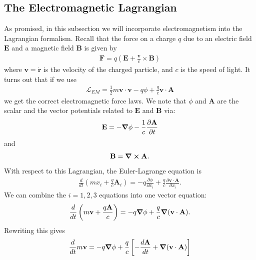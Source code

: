 \documentclass{book}
\theoremstyle{definition}
\newcommand{\p}{\partial}
\newcommand{\lag}{\mathcal{L}}
\newcommand{\f}[2]{\frac{#1}{#2}}
\newcommand{\lp}{\left(}
\newcommand{\rp}{\right)}
\newcommand{\lb}{\left[}
\newcommand{\rb}{\right]}
\begin{document}
\subsection{The Electromagnetic Lagrangian}
As promised, in this subsection we will incorporate electromagnetism into the Lagrangian formalism. Recall that the force on a charge $q$ due to an electric field $\mathbf{E}$ and a magnetic field $\mathbf{B}$ is given by
\begin{align}
\boxed{\mathbf{F} = q\lp \mathbf{E} + \f{\mathbf{v}}{c}\times \mathbf{B} \rp}
\end{align}
where $\mathbf{v} = \dot{\mathbf{r}}$ is the velocity of the charged particle, and $c$ is the speed of light. It turns out that if we use 
\begin{align}
\boxed{\lag_{EM} = \f{1}{2}m\mathbf{v}\cdot\mathbf{v} - q\phi + \f{q}{c}\mathbf{v}\cdot\mathbf{A}}
\end{align}
we get the correct electromagnetic force laws. We note that $\phi$ and $\mathbf{A}$ are the scalar and the vector potentials related to $\mathbf{E}$ and $\mathbf{B}$ via:
\begin{align}
\mathbf{E} = -\grad{\phi} - \f{1}{c}\f{\p \mathbf{A}}{\p t}
\end{align}
and 
\begin{align}
\mathbf{B} = \curl{\mathbf{A}}.
\end{align}
With respect to this Lagrangian, the Euler-Lagrange equation is
\begin{align}
\f{d}{dt}\lp mx_i + \f{q}{c}\mathbf{A}_i \rp = -q\f{\p\phi}{\p x_i} + \f{q}{c}\f{\p \mathbf{v}\cdot\mathbf{A}}{\p x_i}.
\end{align}
We can combine the $i=1,2,3$ equations into one vector equation:
\begin{align}
\f{d}{dt}\lp m\mathbf{v} + \f{q\mathbf{A}}{c} \rp = -q\grad{\phi} + \f{q}{c}\grad{(\mathbf{v}\cdot\mathbf{A})}.
\end{align}
Rewriting this gives
\begin{align}
\f{d}{dt}m\mathbf{v} = -q\grad{\phi} + \f{q}{c}\lb -\f{d\mathbf{A}}{dt} + \grad{(\mathbf{v}\cdot\mathbf{A})} \rb
\end{align}
\end{document}
